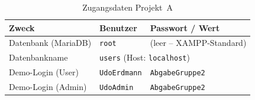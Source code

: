 \begin{table}[!ht]
\centering
\caption{Zugangsdaten Projekt~A}
\label{tab:a-zugang}
\begin{tabularx}{\textwidth}{@{}l l X@{}}
\toprule
\textbf{Zweck} & \textbf{Benutzer} & \textbf{Passwort / Wert} \\
\midrule
Datenbank (MariaDB) & \texttt{root} & (leer -- XAMPP-Standard) \\
Datenbankname       & \multicolumn{2}{l}{\texttt{users} (Host: \texttt{localhost})} \\
Demo-Login (User)   & \texttt{UdoErdmann} & \texttt{AbgabeGruppe2} \\
Demo-Login (Admin)  & \texttt{UdoAdmin}   & \texttt{AbgabeGruppe2} \\
\bottomrule
\end{tabularx}
\end{table}